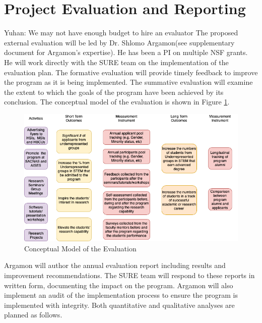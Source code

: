 \documentclass[11pt]{NSFamsart}
\newcommand{\YDNote}[1]{{\color{magenta}Yuhan: #1}}
\begin{document}
\section{Project Evaluation and Reporting}
\YDNote{We may not have enough budget to hire an evaluator}
The proposed external evaluation will be led by Dr. Shlomo Argamon(see supplementary document for
Argamon’s expertise). He has  been a PI on multiple
NSF grants. He will work directly with the SURE team on the implementation of the evaluation
plan. The formative
evaluation will provide timely feedback to improve the program as it is being implemented. The
summative evaluation will examine the extent to which the goals of the program have been achieved
by its conclusion. The conceptual model of the evaluation is shown in Figure \ref{fig:my_label}.
\begin{figure}[ht]
    \centering
    \includegraphics[width = 14cm]{EvaluationPlan.png}
    \caption{Conceptual Model of the Evaluation}
    \label{fig:my_label}
\end{figure}

Argamon will author the annual evaluation report including results and improvement
recommendations. The SURE team will respond to these reports in written form, documenting
the impact on the program. Argamon will also implement an audit of the implementation process
to ensure the program is implemented with integrity. Both quantitative and qualitative analyses are
planned as follows.
\end{document}
